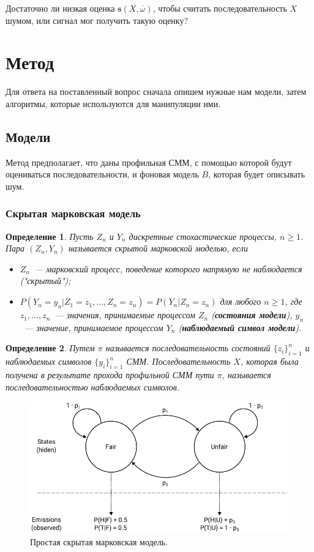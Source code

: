 \documentclass[specialist,
substylefile = spbu_report.rtx,
subf,href,colorlinks=true, 12pt]{disser}
\newtheorem{defenition}{Определение}
\begin{document}
		Достаточно ли низкая оценка $\boldsymbol{s}(X, \overline{\omega})$, чтобы считать последовательность $X$ шумом, или сигнал мог получить такую оценку?
		
	\section{Метод}
		Для ответа на поставленный вопрос сначала опишем нужные нам модели, затем алгоритмы, которые используются для манипуляции ими.
		\subsection{Модели}
			Метод предполагает, что даны профильная СММ, с помощью которой будут оцениваться последовательности, и фоновая модель $B$, которая будет описывать шум.
			\subsubsection{Скрытая марковская модель}
				\begin{defenition}
					Пусть $Z_{n}$ и $Y_{n}$ дискретные стохастические процессы, $n \geq 1$. Пара $(Z_{n}, Y_{n})$ называется скрытой марковской моделью, если
					\begin{itemize}
						\item $Z_{n}$~--- марковский процесс, поведение которого напрямую не наблюдается ("скрытый");
						\item $P(Y_{n} = y_{n}|Z_{1} = z_{1},\dots, Z_{n} = z_{n}) = P(Y_{n}|Z_{n}=z_{n})$ для любого $n \geq 1$, где $z_{1},\dots,z_{n}$~--- значения, принимаемые процессом  $Z_{n}$ (\textbf{состояния модели}), $ y_{n}$~--- значение, принимаемое процессом $Y_{n}$ (\textbf{наблюдаемый символ модели}).
					\end{itemize}
				\end{defenition}	
				
				\begin{defenition}
					Путем $\pi$ называется последовательность состояний $\{z_i\}_{i=1}^{n}$ и наблюдаемых символов $\{y_i\}_{i=1}^{n}$ СММ.
					Последовательность $X$, которая была получена в результате прохода профильной СММ пути $\pi$, называется последовательностью наблюдаемых символов.
				\end{defenition}
				
				\begin{figure}[h]
					\centering
					\includegraphics[width=12cm]{figure1}
					\caption{Простая скрытая марковская модель.} \label{fg:2}
				\end{figure}
			
\end{document}
